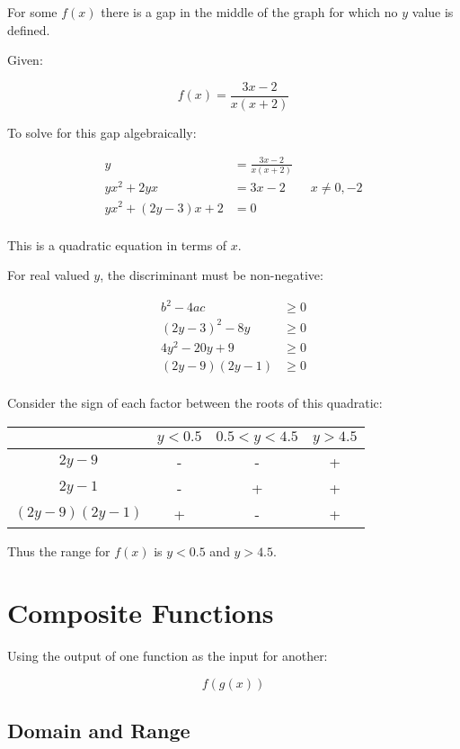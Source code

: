 \documentclass[a4paper,11pt]{report}
\begin{document}
For some $f(x)$ there is a gap in the middle of the graph for which no $y$ value
is defined.

Given:

$$
f(x) = \frac{3x - 2}{x(x + 2)}
$$

To solve for this gap algebraically:

$$
\begin{aligned}
y & = \frac{3x - 2}{x(x + 2)} \\
yx^2 + 2yx & = 3x - 2 \qquad x \neq 0, -2 \\
yx^2 + (2y - 3)x + 2 & = 0 \\
\end{aligned}
$$

This is a quadratic equation in terms of $x$.

For real valued $y$, the discriminant must be non-negative:

$$
\begin{aligned}
b^2 - 4ac & \geq 0 \\
(2y - 3)^2 - 8y & \geq 0 \\
4y^2 - 20y + 9 & \geq 0 \\
(2y - 9)(2y - 1) & \geq 0 \\
\end{aligned}
$$

Consider the sign of each factor between the roots of this quadratic:

\begin{center}
\begin{tabular}{c|c|c|c}
& $y < 0.5$ & $0.5 < y < 4.5$ & $y > 4.5$ \\
\hline
$2y - 9$ & - & - & + \\
$2y - 1$ & - & + & + \\
$(2y - 9)(2y - 1)$ & + & - & + \\
\end{tabular}
\end{center}

Thus the range for $f(x)$ is $y < 0.5$ and $y > 4.5$.


\section{Composite Functions}

Using the output of one function as the input for another:

$$
f(g(x))
$$

\subsection{Domain and Range}
\end{document}

